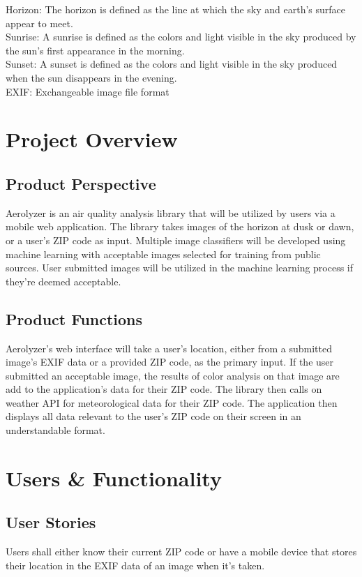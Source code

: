 \documentclass[journal,10pt,draftclsnofoot,onecolumn]{IEEEtran}
\begin{document}
\begin{singlespace}
Horizon: The horizon is defined as the line at which the sky and earth's surface appear to meet.\\

Sunrise: A sunrise is defined as the colors and light visible in the sky produced by the sun's first appearance in the morning.\\

Sunset: A sunset is defined as the colors and light visible in the sky produced when the sun disappears in the evening.\\

EXIF: Exchangeable image file format \\

\section{Project Overview}

\subsection{Product Perspective}
Aerolyzer is an air quality analysis library that will be utilized by users via a mobile web application.
The library takes images of the horizon at dusk or dawn, or a user's ZIP code as input.
Multiple image classifiers will be developed using machine learning with acceptable images selected for training from public sources.
User submitted images will be utilized in the machine learning process if they're deemed acceptable. 

\subsection{Product Functions}
Aerolyzer's web interface will take a user's location, either from a submitted image's EXIF data or a provided ZIP code, as the primary input.
If the user submitted an acceptable image, the results of color analysis on that image are add to the application's data for their ZIP code.
The library then calls on weather API for meteorological data for their ZIP code.
The application then displays all data relevant to the user's ZIP code on their screen in an understandable format.

\section{Users \& Functionality}
\subsection{User Stories}
Users shall either know their current ZIP code or have a mobile device that stores their location in the EXIF data of an image when it's taken.



\end{singlespace}
\end{document}
